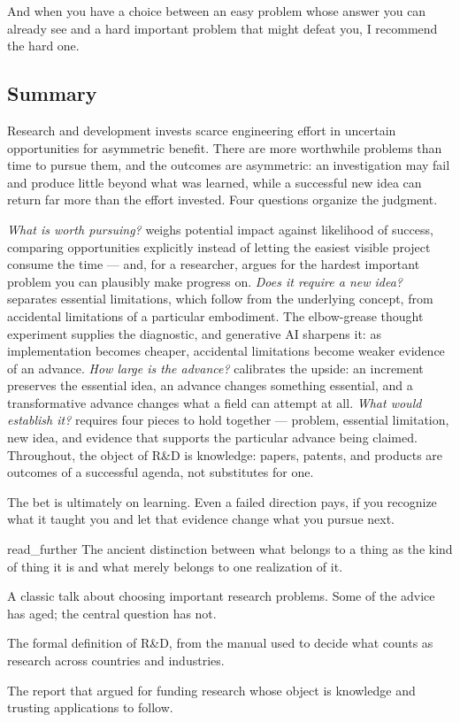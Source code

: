 And when you have a choice between an easy problem whose answer you can already see and a hard
important problem that might defeat you, I recommend the hard one.

\subsection{Summary}\label{summary}

Research and development invests scarce engineering effort in uncertain opportunities for
asymmetric benefit. There are more worthwhile problems than time to pursue them, and the outcomes
are asymmetric: an investigation may fail and produce little beyond what was learned, while a
successful new idea can return far more than the effort invested. Four questions organize the
judgment.

\emph{What is worth pursuing?} weighs potential impact against likelihood of success, comparing
opportunities explicitly instead of letting the easiest visible project consume the time --- and, for
a researcher, argues for the hardest important problem you can plausibly make progress on. \emph{Does it
require a new idea?} separates essential limitations, which follow from the underlying concept,
from accidental limitations of a particular embodiment. The elbow-grease thought experiment
supplies the diagnostic, and generative AI sharpens it: as implementation becomes cheaper,
accidental limitations become weaker evidence of an advance. \emph{How large is the advance?}
calibrates the upside: an increment preserves the essential idea, an advance changes something
essential, and a transformative advance changes what a field can attempt at all. \emph{What would
establish it?} requires four pieces to hold together --- problem, essential limitation, new idea,
and evidence that supports the particular advance being claimed. Throughout, the object of R\&D is
knowledge: papers, patents, and products are outcomes of a successful agenda, not substitutes for
one.

The bet is ultimately on learning. Even a failed direction pays, if you recognize what it taught
you and let that evidence change what you pursue next.

\begin{bookbox}{read_further}{} %
\citep{robertson-sep-essential} The ancient distinction between what belongs to a thing as the kind of
thing it is and what merely belongs to one realization of it.

\citep{hamming1986research} A classic talk about choosing important research problems. Some of the advice
has aged; the central question has not.

\citep{oecd2015frascati} The formal definition of R\&D, from the manual used to decide what counts as
research across countries and industries.

\citep{bush1945frontier} The report that argued for funding research whose object is knowledge and
trusting applications to follow.
\end{bookbox}
